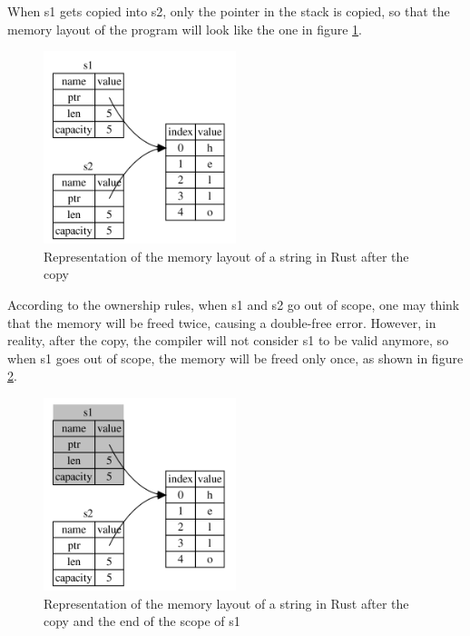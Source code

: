 When s1 gets copied into s2, only the pointer in the stack is copied, so that the memory layout of the program will look like the one in figure \ref{fig:string-memory-rep2}.

\begin{figure}[h]
    \centering
    \includegraphics[width=0.5\textwidth]{figures/string-memory-rep-2.png}
    \caption{Representation of the memory layout of a string in Rust after the copy}
    \label{fig:string-memory-rep2}
\end{figure}

According to the ownership rules, when s1 and s2 go out of scope, one may think that the memory will be freed twice, causing a double-free error. However, in reality, after the copy, the compiler
will not consider s1 to be valid anymore, so when s1 goes out of scope, the memory will be freed only once, as shown in figure \ref{fig:string-memory-rep3}.

\begin{figure}[h]
    \centering
    \includegraphics[width=0.5\textwidth]{figures/string-memory-rep-3.png}
    \caption{Representation of the memory layout of a string in Rust after the copy and the end of the scope of s1}
    \label{fig:string-memory-rep3}
\end{figure}

